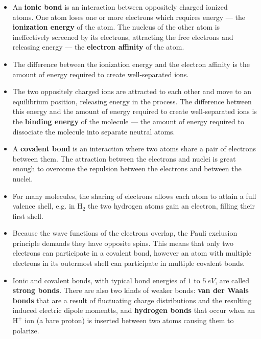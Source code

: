 \documentclass{article}
\begin{document}
\begin{itemize}
  \item An \textbf{ionic bond} is an interaction between oppositely charged ionized \\ atoms. One atom loses one or more electrons which requires energy — the \textbf{ionization energy} of the atom. The nucleus of the other atom is ineffectively screened by its electrons, attracting the free electrons and releasing energy — the \textbf{electron affinity} of the atom.

  \item The difference between the ionization energy and the electron affinity is the amount of energy required to create well-separated ions.

  \item The two oppositely charged ions are attracted to each other and move to an equilibrium position, releasing energy in the process. The difference between this energy and the amount of energy required to create well-separated ions is the \textbf{binding energy} of the molecule — the amount of energy required to dissociate the molecule into separate neutral atoms.

  \item A \textbf{covalent bond} is an interaction where two atoms share a pair of electrons between them. The attraction between the electrons and nuclei is great enough to overcome the repulsion between the electrons and between the nuclei.

  \item For many molecules, the sharing of electrons allows each atom to attain a full valence shell, e.g. in $\text{H}_2$ the two hydrogen atoms gain an electron, filling their first shell.

  \item Because the wave functions of the electrons overlap, the Pauli exclusion principle demands they have opposite spins. This means that only two electrons can participate in a covalent bond, however an atom with multiple electrons in its outermost shell can participate in multiple covalent bonds.

  \item Ionic and covalent bonds, with typical bond energies of $1$ to $\qty{5}{eV}$, are called \textbf{strong bonds}. There are also two kinds of weaker bonds: \textbf{van der Waals bonds} that are a result of fluctuating charge distributions and the resulting induced electric dipole momentts, and \textbf{hydrogen bonds} that occur when an $\text{H}^+$ ion (a bare proton) is inserted between two atoms causing them to polarize.
\end{itemize}
\end{document}
